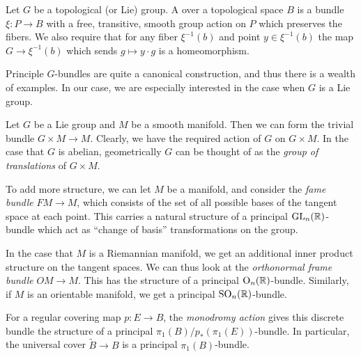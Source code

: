 \documentclass{article}
\begin{document}
\begin{definition}
  Let $G$ be a topological (or Lie) group. A  over a topological space $B$ is a bundle $\xi : P \to B$ with a free, transitive, smooth group action on $P$ which preserves the fibers. We also require that for any fiber $\xi^{-1}(b)$ and point $y\in \xi^{-1}(b)$ the map $G \to \xi^{-1}(b)$ which sends $g\mapsto y\cdot g$ is a homeomorphism.
\end{definition}

Principle $G$-bundles are quite a canonical construction, and thus there is a wealth of examples. In our case, we are especially interested in the case when $G$ is a Lie group.

\begin{example}
  Let $G$ be a Lie group and $M$ be a smooth manifold. Then we can form the trivial bundle $G\times M \to M$. Clearly, we have the required action of $G$ on $G\times M$. In the case that $G$ is abelian, geometrically $G$ can be thought of as the \emph{group of translations} of $G\times M$. 
\end{example}

\begin{example}
  To add more structure, we can let $M$ be a manifold, and consider the \emph{fame bundle} $FM \to M$, which consists of the set of all possible bases of the tangent space at each point. This carries a natural structure of a principal $\mathrm{GL}_n(\mathbb{R})$-bundle which act as ``change of basis'' transformations on the group.
\end{example}

\begin{example}
  In the case that $M$ is a Riemannian manifold, we get an additional inner product structure on the tangent spaces. We can thus look at the \emph{orthonormal frame bundle} $OM \to M$. This has the structure of a principal $\mathrm{O}_n(\mathbb{R})$-bundle. Similarly, if $M$ is an orientable manifold, we get a principal $\mathrm{SO}_n(\mathbb{R})$-bundle.
\end{example}

\begin{example}
  For a regular covering map $p : E \to B$, the \emph{monodromy action} gives this discrete bundle the structure of a principal $\pi_1(B)/p_*(\pi_1(E))$-bundle. In particular, the universal cover $\widetilde{B} \to B$ is a principal $\pi_1(B)$-bundle.
\end{example}
\end{document}
